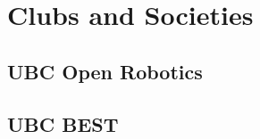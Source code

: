 \documentclass[]{aftab-resume}
\begin{document}
\begin{minipage}[t]{0.33\textwidth}
\vspace{0.9cm}


\section{Clubs and Societies} 
\vspace{0.15cm}

\subsection{UBC Open Robotics}
\vspace{0.175cm}
\subsection{UBC BEST}
\sectionsep

%
%

\end{minipage} 
\hfill
\end{document}
